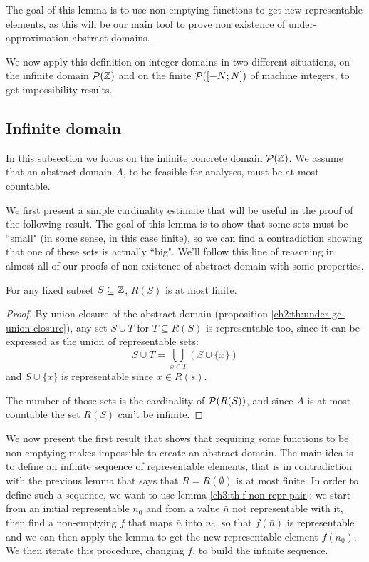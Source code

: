 The goal of this lemma is to use non emptying functions to get new representable elements, as this will be our main tool to prove non existence of under-approximation abstract domains.

We now apply this definition on integer domains in two different situations, on the infinite domain $\mathcal{P}(\mathbb{Z})$ and on the finite $\mathcal{P}([-N; N])$ of machine integers, to get impossibility results.

\subsection{Infinite domain}
In this subsection we focus on the infinite concrete domain $\mathcal{P}(\mathbb{Z})$. We assume that an abstract domain $A$, to be feasible for analyses, must be at most countable.

We first present a simple cardinality estimate that will be useful in the proof of the following result. The goal of this lemma is to show that some sets must be ``small" (in some sense, in this case finite), so we can find a contradiction showing that one of these sets is actually ``big". We'll follow this line of reasoning in almost all of our proofs of non existence of abstract domain with some properties.

\begin{lemma}\label{ch3:th:R-S-bound-integer-inf}
	For any fixed subset $S \subseteq \mathbb{Z}$, $R(S)$ is at most finite.
\end{lemma}
\begin{proof}
	By union closure of the abstract domain (proposition \ref{ch2:th:under-gc-union-closure}), any set $S \cup T$ for $T \subseteq R(S)$ is representable too, since it can be expressed as the union of representable sets:
	\[
	S \cup T = \bigcup\limits_{x \in T} (S \cup \{ x \})
	\]
	and $S \cup \{ x \}$ is representable since $x \in R(s)$.

	The number of those sets is the cardinality of $\mathcal{P}(R(S))$, and since $A$ is at most countable the set $R(S)$ can't be infinite.
\end{proof}

We now present the first result that shows that requiring some functions to be non emptying makes impossible to create an abstract domain. The main idea is to define an infinite sequence of representable elements, that is in contradiction with the previous lemma that says that $R = R(\emptyset)$ is at most finite.
In order to define such a sequence, we want to use lemma \ref{ch3:th:f-non-repr-pair}: we start from an initial representable $n_0$ and from a value $\bar{n}$ not representable with it, then find a non-emptying $f$ that maps $\bar{n}$ into $n_0$, so that $f(\bar{n})$ is representable and we can then apply the lemma to get the new representable element $f(n_0)$. We then iterate this procedure, changing $f$, to build the infinite sequence.

